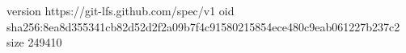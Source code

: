version https://git-lfs.github.com/spec/v1
oid sha256:8ea8d355341cb82d52d2f2a09b7f4c91580215854ece480c9eab061227b237c2
size 249410
